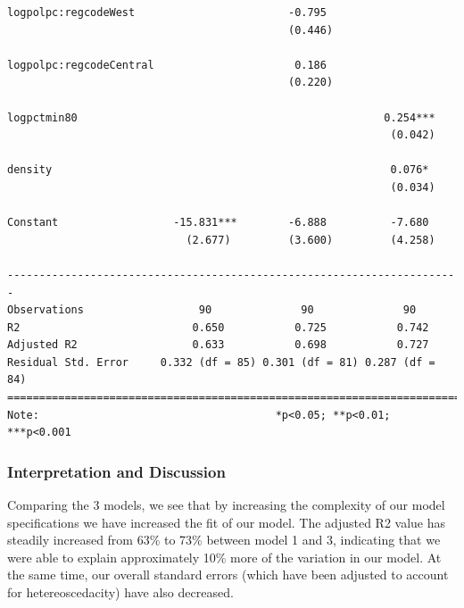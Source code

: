 \documentclass[]{article}
\begin{document}
\begin{verbatim}
logpolpc:regcodeWest                        -0.795                     
                                            (0.446)                    
                                                                       
logpolpc:regcodeCentral                      0.186                     
                                            (0.220)                    
                                                                       
logpctmin80                                                0.254***    
                                                            (0.042)    
                                                                       
density                                                     0.076*     
                                                            (0.034)    
                                                                       
Constant                  -15.831***        -6.888          -7.680     
                            (2.677)         (3.600)         (4.258)    
                                                                       
-----------------------------------------------------------------------
Observations                  90              90              90       
R2                           0.650           0.725           0.742     
Adjusted R2                  0.633           0.698           0.727     
Residual Std. Error     0.332 (df = 85) 0.301 (df = 81) 0.287 (df = 84)
=======================================================================
Note:                                     *p<0.05; **p<0.01; ***p<0.001
\end{verbatim}

\hypertarget{interpretation-and-discussion}{%
\subsubsection{Interpretation and
Discussion}\label{interpretation-and-discussion}}

Comparing the 3 models, we see that by increasing the complexity of our
model specifications we have increased the fit of our model. The
adjusted R2 value has steadily increased from 63\% to 73\% between model
1 and 3, indicating that we were able to explain approximately 10\% more
of the variation in our model. At the same time, our overall standard
errors (which have been adjusted to account for hetereoscedacity) have
also decreased.
\end{document}
